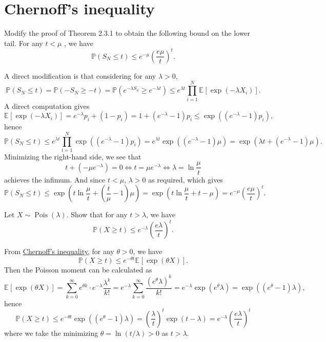 \section{Chernoff's inequality}
\begin{problem*}[Exercise 2.3.2]\label{ex2.3.2}
	Modify the proof of Theorem 2.3.1 to obtain the following bound on the lower tail. For any \(t < \mu \) , we have
	\[
		\mathbb{P}(S_N \leq t)
		\leq e^{-\mu } \left( \frac{e \mu }{t} \right) ^t.
	\]
\end{problem*}
\begin{answer}
	A direct modification is that considering for any \(\lambda > 0\),
	\[
		\mathbb{P} (S_N \leq t)
		= \mathbb{P} (-S_N \geq -t)
		= \mathbb{P} (e^{-\lambda S_n} \geq e^{-\lambda t})
		\leq e^{\lambda t} \prod_{i=1}^{N} \mathbb{E}_{}\left[\exp (-\lambda X_i) \right] .
	\]
	A direct computation gives
	\[
		\mathbb{E}_{}\left[\exp (-\lambda X_i) \right]
		= e^{-\lambda} p_i + (1 - p_i)
		= 1 + (e^{-\lambda } - 1) p_i
		\leq \exp ((e^{-\lambda } - 1)p_i),
	\]
	hence
	\[
		\mathbb{P} (S_N \leq t)
		\leq e^{\lambda t} \prod_{i=1}^{N} \exp ((e^{-\lambda } - 1) p_i)
		= e^{\lambda t} \exp ((e^{-\lambda } - 1) \mu )
		= \exp (\lambda t + (e^{-\lambda } - 1) \mu ).
	\]
	Minimizing the right-hand side, we see that
	\[
		t + (- \mu e^{-\lambda } ) = 0
		\iff t = \mu e^{-\lambda }
		\iff \lambda = \ln \frac{\mu }{t}
	\]
	achieves the infimum. And since \(t < \mu \), \(\lambda > 0\) as required, which gives
	\[
		\mathbb{P} (S_N \leq t)
		\leq \exp (t\ln \frac{\mu}{t} + \left( \frac{t}{\mu } - 1 \right) \mu )
		= \exp (t \ln \frac{\mu}{t} + t - \mu )
		= e^{-\mu } \left( \frac{e \mu }{t} \right) ^t.
	\]
\end{answer}

\begin{problem*}[Exercise 2.3.3]\label{ex2.3.3}
	Let \(X \sim \operatorname{Pois}(\lambda ) \). Show that for any \(t > \lambda \), we have
	\[
		\mathbb{P} (X \geq t)
		\leq e^{-\lambda } \left( \frac{e \lambda }{t} \right) ^t.
	\]
\end{problem*}
\begin{answer}
	From \hyperref[lma:Crarmer-Chernoff]{Chernoff's inequality}, for any \(\theta > 0\), we have
	\[
		\mathbb{P} (X \geq t)
		\leq e^{-\theta t} \mathbb{E}_{}\left[\exp (\theta X) \right].
	\]
	Then the Poisson moment can be calculated as
	\[
		\mathbb{E}_{}\left[\exp (\theta X) \right]
		= \sum_{k=0}^{\infty} e^{\theta k} \cdot e^{-\lambda } \frac{\lambda ^k}{k!}
		= e^{- \lambda } \sum_{k=0}^{\infty} \frac{(e^{\theta } \lambda )^k}{k!}
		= e^{-\lambda } \exp (e^\theta \lambda )
		= \exp ((e^\theta - 1)\lambda ),
	\]
	hence
	\[
		\mathbb{P} (X \geq t)
		\leq e^{-\theta t} \exp ((e^\theta - 1) \lambda )
		= \left( \frac{\lambda}{t} \right) ^t \exp (t - \lambda )
		= e^{-\lambda } \left( \frac{e \lambda }{t} \right) ^t
	\]
	where we take the minimizing \(\theta = \ln (t / \lambda) > 0\) as \(t > \lambda \).
\end{answer}

